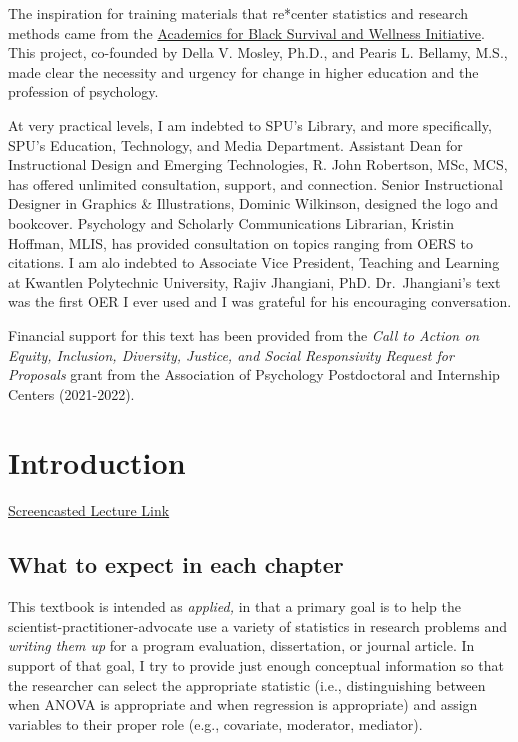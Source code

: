 \documentclass[
  english,
]{book}
\begin{document}
The inspiration for training materials that re*center statistics and research methods came from the \href{https://www.academics4blacklives.com/}{Academics for Black Survival and Wellness Initiative}. This project, co-founded by Della V. Mosley, Ph.D., and Pearis L. Bellamy, M.S., made clear the necessity and urgency for change in higher education and the profession of psychology.

At very practical levels, I am indebted to SPU's Library, and more specifically, SPU's Education, Technology, and Media Department. Assistant Dean for Instructional Design and Emerging Technologies, R. John Robertson, MSc, MCS, has offered unlimited consultation, support, and connection. Senior Instructional Designer in Graphics \& Illustrations, Dominic Wilkinson, designed the logo and bookcover. Psychology and Scholarly Communications Librarian, Kristin Hoffman, MLIS, has provided consultation on topics ranging from OERS to citations. I am alo indebted to Associate Vice President, Teaching and Learning at Kwantlen Polytechnic University, Rajiv Jhangiani, PhD. Dr.~Jhangiani's text \citeyearpar{jhangiani_research_2019} was the first OER I ever used and I was grateful for his encouraging conversation.

Financial support for this text has been provided from the \emph{Call to Action on Equity, Inclusion, Diversity, Justice, and Social Responsivity
Request for Proposals} grant from the Association of Psychology Postdoctoral and Internship Centers (2021-2022).

\hypertarget{ReCintro}{%
\chapter{Introduction}\label{ReCintro}}

\href{https://spu.hosted.panopto.com/Panopto/Pages/Viewer.aspx?pid=cc9b7c0d-e5c3-4e4e-a469-acf7013ee761}{Screencasted Lecture Link}

\hypertarget{what-to-expect-in-each-chapter}{%
\section{What to expect in each chapter}\label{what-to-expect-in-each-chapter}}

This textbook is intended as \emph{applied,} in that a primary goal is to help the scientist-practitioner-advocate use a variety of statistics in research problems and \emph{writing them up} for a program evaluation, dissertation, or journal article. In support of that goal, I try to provide just enough conceptual information so that the researcher can select the appropriate statistic (i.e., distinguishing between when ANOVA is appropriate and when regression is appropriate) and assign variables to their proper role (e.g., covariate, moderator, mediator).
\end{document}
